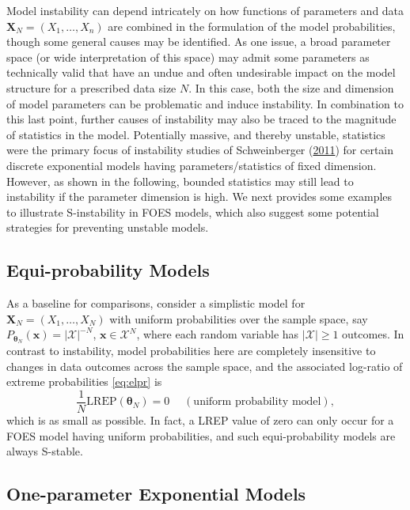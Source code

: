 \documentclass[]{article}
\theoremstyle{definition}
\newcommand{\REP}{\mathrm{LREP}}
\begin{document}
Model instability can depend intricately on how functions of parameters
and data \(\boldsymbol X_N=(X_1,\ldots,X_n)\) are combined in the
formulation of the model probabilities, though some general causes may
be identified. As one issue, a broad parameter space (or wide
interpretation of this space) may admit some parameters as technically
valid that have an undue and often undesirable impact on the model
structure for a prescribed data size \(N\). In this case, both the size
and dimension of model parameters can be problematic and induce
instability. In combination to this last point, further causes of
instability may also be traced to the magnitude of statistics in the
model. Potentially massive, and thereby unstable, statistics were the
primary focus of instability studies of Schweinberger
(\protect\hyperlink{ref-schweinberger2011instability}{2011}) for certain
discrete exponential models having parameters/statistics of fixed
dimension. However, as shown in the following, bounded statistics may
still lead to instability if the parameter dimension is high. We next
provides some examples to illustrate S-instability in FOES models, which
also suggest some potential strategies for preventing unstable models.

\subsection{Equi-probability Models}\label{equi-probability-models}

As a baseline for comparisons, consider a simplistic model for
\(\boldsymbol X_N=(X_1,\ldots,X_N)\) with uniform probabilities over the
sample space, say
\(P_{\boldsymbol \theta_N}(\boldsymbol x)= |\mathcal{X}|^{-N}\),
\(\boldsymbol x \in \mathcal{X}^N\), where each random variable has
\(|\mathcal{X}| \geq 1\) outcomes. In contrast to instability, model
probabilities here are completely insensitive to changes in data
outcomes across the sample space, and the associated log-ratio of
extreme probabilities \eqref{eq:elpr} is \[
\frac{1}{N} \REP(\boldsymbol \theta_N)=0\quad \;(\text{uniform probability model}),
\] which is as small as possible. In fact, a LREP value of zero can only
occur for a FOES model having uniform probabilities, and such
equi-probability models are always S-stable.

\subsection{One-parameter Exponential Models}\label{one-param-exp}
\end{document}
